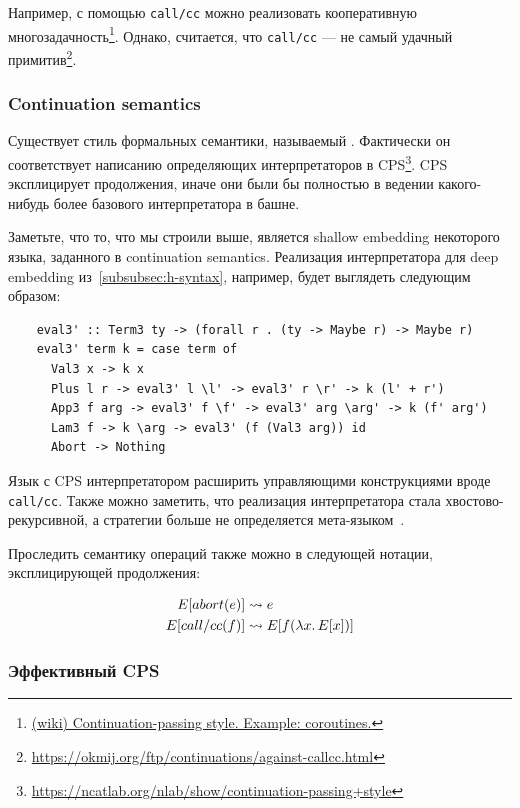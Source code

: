 Например, с помощью \texttt{call/cc} можно реализовать кооперативную многозадачность\footnote{\href{https://en.wikibooks.org/wiki/Haskell/Continuation_passing_style\#Example:_coroutines}{(wiki) Continuation-passing style.
Example: coroutines.}}.
Однако, считается, что \texttt{call/cc} --- не самый удачный примитив\footnote{\url{https://okmij.org/ftp/continuations/against-callcc.html}}.

\subsubsection{Continuation semantics}

Существует стиль формальных семантики, называемый .
Фактически он соответствует написанию определяющих интерпретаторов в CPS\footnote{\url{https://ncatlab.org/nlab/show/continuation-passing+style}}.
CPS эксплицирует продолжения, иначе они были бы полностью в ведении какого-нибудь более базового интерпретатора в башне.

Заметьте, что то, что мы строили выше, является shallow embedding некоторого языка, заданного в continuation semantics.
Реализация интерпретатора для deep embedding из~\ref{subsubsec:h-syntax}, например, будет выглядеть следующим образом:
\begin{verbatim}
    eval3' :: Term3 ty -> (forall r . (ty -> Maybe r) -> Maybe r)
    eval3' term k = case term of
      Val3 x -> k x
      Plus l r -> eval3' l \l' -> eval3' r \r' -> k (l' + r')
      App3 f arg -> eval3' f \f' -> eval3' arg \arg' -> k (f' arg')
      Lam3 f -> k \arg -> eval3' (f (Val3 arg)) id
      Abort -> Nothing
\end{verbatim}

Язык с CPS интерпретатором расширить управляющими конструкциями вроде \texttt{call/cc}.
Также можно заметить, что реализация интерпретатора стала хвостово-рекурсивной, а стратегии больше не определяется мета-языком~\cite{reynolds1972definitional}.


Проследить семантику операций также можно в следующей нотации, эксплицирующей продолжения:

\begin{align*}
    E[abort(e)] &\rightsquigarrow e\\
    E[call/cc(f)] &\rightsquigarrow E[f(\lambda x\ldotp E[x])]
\end{align*}

\subsubsection{Эффективный CPS}

